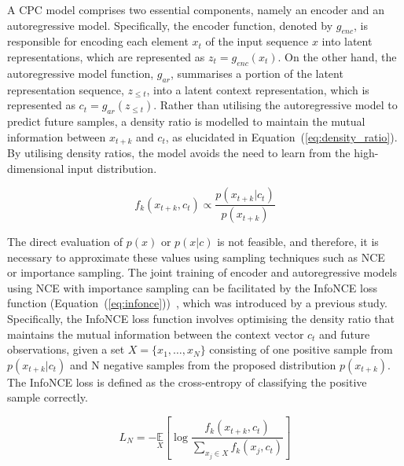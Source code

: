 A CPC model comprises two essential components, namely an encoder and an autoregressive model. Specifically, the encoder function, denoted by $g_{enc}$, is responsible for encoding each element $x_t$ of the input sequence $x$ into latent representations, which are represented as $z_t = g_{enc}(x_t)$. On the other hand, the autoregressive model function, $g_{ar}$, summarises a portion of the latent representation sequence, $z_{\le t}$, into a latent context representation, which is represented as $c_t = g_{ar}(z_{\le t})$. Rather than utilising the autoregressive model to predict future samples, a density ratio is modelled to maintain the mutual information between $x_{t+k}$ and $c_t$, as elucidated in Equation~(\ref{eq:density_ratio}). By utilising density ratios, the model avoids the need to learn from the high-dimensional input distribution.

\begin{equation}
	f_k(x_{t+k},c_t) \propto \frac{p(x_{t+k}|c_t)}{p(x_{t+k})}
	\label{eq:density_ratio}
\end{equation}

The direct evaluation of $p(x)$ or $p(x|c)$ is not feasible, and therefore, it is necessary to approximate these values using sampling techniques such as NCE~\citep{gutmann2010noise} or importance sampling. The joint training of encoder and autoregressive models using NCE with importance sampling can be facilitated by the InfoNCE loss function (Equation~(\ref{eq:infonce}))~\citep{oord2018representation}, which was introduced by a previous study. Specifically, the InfoNCE loss function involves optimising the density ratio that maintains the mutual information between the context vector $c_t$ and future observations, given a set $X = \{x_1,…,x_N\}$ consisting of one positive sample from $p(x_{t+k}|c_t)$ and N negative samples from the proposed distribution $p(x_{t+k})$. The InfoNCE loss is defined as the cross-entropy of classifying the positive sample correctly.

\begin{equation}
	L_N=-\underset{X}{\mathbb{E}}\left[\log\frac{f_k(x_{t+k},c_t)}{\sum_{x_j\in X}f_k(x_j,c_t)}\right]
	\label{eq:infonce}
\end{equation}


